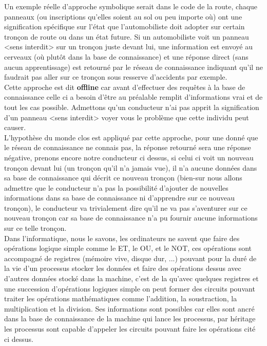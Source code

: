 Un exemple réelle d'approche symbolique serait dans le code de la route, chaque panneaux (ou inscriptions qu'elles soient au sol ou peu importe où) ont une signification spécifique sur l'état que l'automobiliste doit adopter sur certain tronçon de route ou dans un état future. Si un automobiliste voit un panneau <sens interdit> sur un tronçon juste devant lui, une information est envoyé au cerveaux (où plutôt dans la base de connaissance) et une réponse direct (sans aucun apprentissage) est retourné par le réseau de connaissance indiquant qu'il ne faudrait pas aller sur ce tronçon sous resserve d'accidents par exemple.\\
Cette approche est dit \textbf{offline} car avant d'effectuer des requêtes à la base de connaissance celle ci a besoin d'être au préalable remplit d'informations vrai et de tout les cas possible. Admettons qu'un conducteur n'ai pas apprit la signification d'un panneau <sens interdit> voyer vous le problème que cette individu peut causer.\\
L'hypothèse du monde clos est appliqué par cette approche, pour une donné que le réseau de connaissance ne connais pas, la réponse retourné sera une réponse négative, prenons encore notre conducteur ci dessus, si celui ci voit un nouveau tronçon devant lui (un tronçon qu'il n'a jamais vue), il n'a aucune données dans sa base de connaissance qui décrit ce nouveau tronçon (bien-sur nous allons admettre que le conducteur n'a pas la possibilité d'ajouter de nouvelles informations dans sa base de connaissance ni d'apprendre sur ce nouveau tronçon), le conducteur va trivialement dire qu'il ne va pas s'aventurer sur ce nouveau tronçon car sa base de connaissance n'a pu fournir aucune informations sur ce telle tronçon. \\
\linebreak
Dans l'informatique, nous le savons, les ordinateurs ne savent que faire des opérations logique simple comme le ET, le OU, et le NOT, ces opérations sont accompagné de registres (mémoire vive, disque dur, ...) pouvant pour la duré de la vie d'un processus stocker les données et faire des opérations dessus avec d'autres données stocké dans la machine, c'est de la qu'avec quelques registres et une succession d'opérations logiques simple on peut former des circuits pouvant traiter les opérations mathématiques comme l'addition, la soustraction, la multiplication et la division.
Ses informations sont possibles car elles sont ancré dans la base de connaissance de la machine qui lance les processus, par héritage les processus sont capable d'appeler les circuits pouvant faire les opérations cité ci dessus. \\
